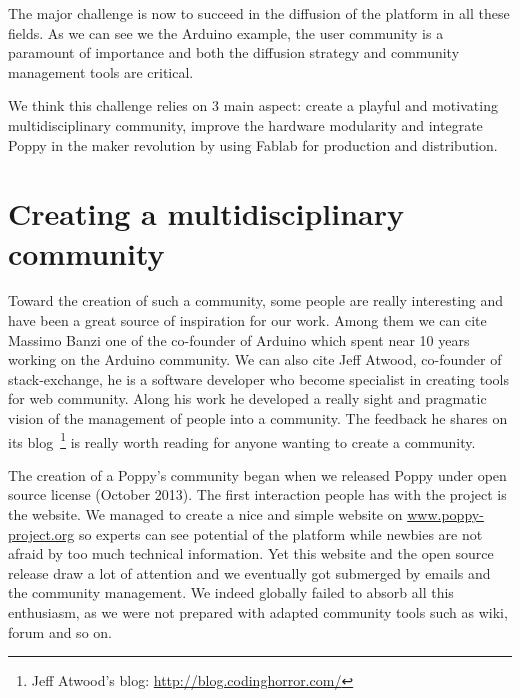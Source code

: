 
The major challenge is now to succeed in the diffusion of the platform in all these fields. As we can see we the Arduino example, the user community is a paramount of importance and both the diffusion strategy and community management tools are critical.

We think this challenge relies on 3 main aspect: create a playful and motivating multidisciplinary community, improve the hardware modularity and integrate Poppy in the maker revolution by using Fablab for production and distribution.



\section{Creating a multidisciplinary community} %
\label{sec:creating_a_multi}

Toward the creation of such a community, some people are really interesting and have been a great source of inspiration for our work. Among them we can cite Massimo Banzi one of the co-founder of Arduino which spent near 10 years working on the Arduino community. We can also cite Jeff Atwood, co-founder of stack-exchange, he is a software developer who become specialist in creating tools for web community. Along his work he developed a really sight and pragmatic vision of the management of people into a community. The feedback he shares on its blog~\footnote{Jeff Atwood's blog: \url{http://blog.codinghorror.com/}} is really worth reading for anyone wanting to create a community.

The creation of a Poppy's community began when we released Poppy under open source license (October 2013).
The first interaction people has with the project is the website. We managed to create a nice and simple website on \url{www.poppy-project.org} so experts can see potential of the platform while newbies are not afraid by too much technical information.
Yet this website and the open source release draw a lot of attention and we eventually got submerged by emails and the community management. We indeed globally failed to absorb all this enthusiasm, as we were not prepared with adapted community tools such as wiki, forum and so on.

